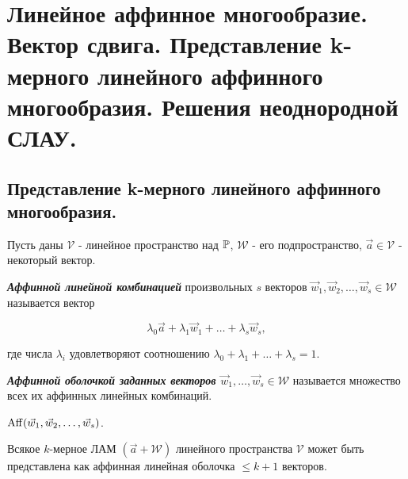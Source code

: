\section{
    Линейное аффинное многообразие. Вектор сдвига. Представление k-мерного линейного аффинного многообразия. Решения неоднородной СЛАУ. 
}

\subsection{
    Представление k-мерного линейного аффинного многообразия.
}

Пусть даны $\mathcal{V}$ - линейное пространство над $\mathbb{P}$, $\mathcal{W}$ - его подпространство, $\vec{a} \in \mathcal{V}$ - некоторый вектор.

\begin{definition}
    \textbf{\textit{Аффинной линейной комбинацией}} произвольных $s$ векторов $\vec{w}_1, \vec{w}_2, \ldots, \vec{w}_s \in \mathcal{W}$ называется вектор

    $$\lambda_0\vec{a} + \lambda_1\vec{w}_1 + \ldots + \lambda_s\vec{w}_s,$$

    где числа $\lambda_i$ удовлетворяют соотношению $\lambda_0 + \lambda_1 + \ldots + \lambda_s = 1$.
\end{definition}

\begin{definition}
    \textbf{\textit{Аффинной оболочкой заданных векторов $\vec{w}_1, \ldots, \vec{w}_s \in \mathcal{W}$}} называется множество всех их аффинных линейных комбинаций.
\end{definition}

\begin{designation}
    $\operatorname{\mathop{\mathrm{Aff}}}(\vec{w}_1, \vec{w}_2, \ldots, \vec{w}_s)$.
\end{designation}

\begin{theorem}
    Всякое $k$-мерное ЛАМ $(\vec{a} + \mathcal{W})$ линейного пространства $\mathcal{V}$ может быть представлена как аффинная линейная оболочка $\leq k + 1$ векторов.
\end{theorem}

